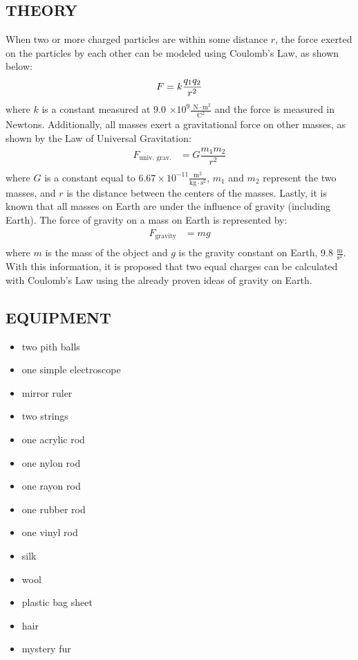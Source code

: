 \documentclass [12pt, letterpaper, twoside]{article}
\begin{document}
\subsection*{THEORY}
When two or more charged particles are within some distance \(r\), the force exerted on the particles by each other can be modeled using Coulomb's Law, as shown below:
\begin{equation} \label{eq:1}
    F = k\dfrac{q_{1}q_{2}}{r^2} \\
\end{equation}
where \(k\) is a constant measured at 9.0 \(\times 10^9 \tfrac{\text{ N}\cdot\text{m}^2}{\text{C}^2}\) and the force is measured in Newtons. Additionally, all masses exert a gravitational force on other masses, as shown by the Law of Universal Gravitation:
\begin{equation}
  \begin{split}
    F_{\text{univ. grav.}} &= G\dfrac{m_{1}m_{2}}{r^2} \\
  \end{split}
\end{equation}
where \(G\) is a constant equal to \(6.67\times{10^{-11}}\tfrac{\text{m}^2}{\text{kg}\cdot{\text{s}^2}}\), \(m_{1}\) and \(m_{2}\) represent the two masses, and \(r\) is the distance between the centers of the masses. Lastly, it is known that all masses on Earth are under the influence of gravity (including Earth). The force of gravity on a mass on Earth is represented by:
\begin{equation}
  \begin{split}
    F_{\text{gravity}} &= mg \\
  \end{split}
\end{equation}
where \(m\) is the mass of the object and \(g\) is the gravity constant on Earth, 9.8 \(\tfrac{\text{m}}{\text{s}^2}\). With this information, it is proposed that two equal charges can be calculated with Coulomb's Law using the already proven ideas of gravity on Earth.

\subsection*{EQUIPMENT}
  \noindent
  \begin{itemize}
    \itemsep0em
    \item{two pith balls}
    \item{one simple electroscope}
    \item{mirror ruler}
    \item{two strings}
    \item{one acrylic rod}
    \item{one nylon rod}
    \item{one rayon rod}
    \item{one rubber rod}
    \item{one vinyl rod}
    \item{silk}
    \item{wool}
    \item{plastic bag sheet}
    \item{hair}
    \item{mystery fur}
  \end{itemize}
\end{document}
